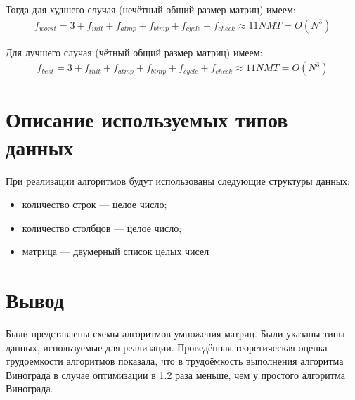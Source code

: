 Тогда для худшего случая (нечётный общий размер матриц) имеем:
\begin{equation}
	\label{сomplexity:vinograd_opt_worst}
	\begin{aligned}
		f_{worst} = 3 + f_{init} + f_{atmp} + f_{btmp} + f_{cycle} + f_{check} \approx 11NMT = O(N^3)
	\end{aligned}
\end{equation}

Для лучшего случая (чётный общий размер матриц) имеем:
\begin{equation}
	\label{сomplexity:vinograd_opt_best}
	\begin{aligned}
		f_{best} = 3 + f_{init} + f_{atmp} + f_{btmp} + f_{cycle} + f_{check} \approx 11NMT = O(N^3)
	\end{aligned}
\end{equation}

\section{Описание используемых типов данных}

При реализации алгоритмов будут использованы следующие структуры данных:

\begin{itemize}
	\item количество строк --- целое число;
	\item количество столбцов --- целое число;
	\item матрица --- двумерный список целых чисел
\end{itemize}

\section{Вывод}

Были представлены схемы алгоритмов умножения матриц. Были указаны типы данных, используемые для реализации. Проведённая теоретическая оценка трудоемкости алгоритмов показала, что в трудоёмкость выполнения алгоритма Винограда в случае оптимизации в 1.2 раза меньше, чем у простого алгоритма Винограда.
